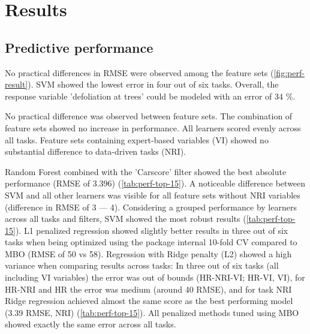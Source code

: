 \documentclass[letterpaper, peerreview]{IEEEtran}
\begin{document}
\section{Results}

\subsection{Predictive performance}

\noindent No practical differences in RMSE were observed among the feature sets (\autoref{fig:perf-result}).
SVM showed the lowest error in four out of six tasks.
Overall, the response variable 'defoliation at trees' could be modeled with an error of 34 \%.

No practical difference was observed between feature sets.
The combination of feature sets showed no increase in performance.
All learners scored evenly across all tasks.
Feature sets containing expert-based variables (VI) showed no substantial difference to data-driven tasks (NRI).

Random Forest combined with the 'Carscore' filter showed the best absolute performance (RMSE of 3.396) (\autoref{tab:perf-top-15}).
A noticeable difference between SVM and all other learners was visible for all
feature sets without NRI variables (difference in RMSE of 3 --- 4).
Considering a grouped performance by learners across all tasks and filters, SVM showed the most robust results (\autoref{tab:perf-top-15}).
L1 penalized regression showed slightly better results in three out of six tasks when being optimized using the package internal 10-fold CV compared to MBO (RMSE of 50 vs 58).
Regression with Ridge penalty (L2) showed a high variance when comparing results across tasks: In three out of six tasks (all including VI variables) the error was out of bounds (HR-NRI-VI\@; HR-VI, VI), for HR-NRI and HR the error was medium (around 40 RMSE), and for task NRI Ridge regression achieved almost the same score as the best performing model (3.39 RMSE, NRI) (\autoref{tab:perf-top-15}).
All penalized methods tuned using MBO showed exactly the same error across all tasks.
\end{document}
